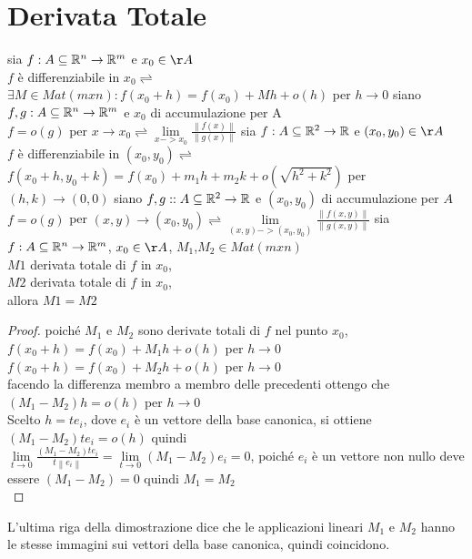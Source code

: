 \section{Derivata Totale}
sia $f:A\subseteq \mathbb{R}^n\rightarrow \mathbb{R}^m$ e $x_0\in\AA$ \\
$f$ è differenziabile in $x_0\rightleftharpoons$ $\exists M\in Mat(mxn) : f(x_0+h) = f(x_0)+Mh+o(h)$ per $h\rightarrow 0$ 
siano $f,g : A\subseteq \mathbb{R}^n\rightarrow \mathbb{R}^m$ e $x_0$ di accumulazione per A \\
$f=o(g)$ per $x\rightarrow x_0 \rightleftharpoons \lim\limits_{x->x_0}\frac{\left\| f(x)\right\| }{\left\| g(x)\right\| }$
sia $f:A\subseteq \mathbb{R}^2\rightarrow \mathbb{R}$ e $(x_0,y_0)\in\AA$ \\
$f$ è differenziabile in $(x_0,y_0)\rightleftharpoons$ $f(x_0+h,y_0+k) = f(x_0)+m_1h+m_2k+o(\sqrt{h^2+k^2})$ per $(h,k)\rightarrow (0,0)$
siano $f,g : :A\subseteq \mathbb{R}^2\rightarrow \mathbb{R}$ e $(x_0,y_0)$ di accumulazione per $A$ \\
$f=o(g)$ per $(x,y)\rightarrow (x_0,y_0) \rightleftharpoons \lim\limits_{(x,y)->(x_0,y_0)}\frac{\left\| f(x,y)\right\| }{\left\| g(x,y)\right\| }$
sia $f:A\subseteq \mathbb{R}^n\rightarrow \mathbb{R}^m$, $x_0\in\AA$, $M_1$,$M_2\in Mat(mxn)$\\
$M1$ derivata totale di $f$ in $x_0$,\\
$M2$ derivata totale di $f$ in $x_0$,\\
allora $M1=M2$\\
\begin{proof}
	poiché $M_1$ e $M_2$ sono derivate totali di $f$ nel punto $x_0$,\\
	$f(x_0+h) = f(x_0)+M_1h+o(h)$ per $h\rightarrow 0$\\
	$f(x_0+h) = f(x_0)+M_2h+o(h)$ per $h\rightarrow 0$\\
	facendo la differenza membro a membro delle precedenti ottengo che $(M_1-M_2)h=o(h)$ per $h\rightarrow 0$\\
	Scelto $h=te_i$, dove $e_i$ è un vettore della base canonica, si ottiene $(M_1-M_2)te_i=o(h)$ quindi\\
	$\lim\limits_{t\rightarrow 0}\frac{(M_1-M_2)te_i}{t\left\| e_i\right\| } = \lim\limits_{t\rightarrow 0}(M_1-M_2)e_i = 0$, poiché $e_i$ è un vettore non nullo deve essere $(M_1-M_2)=0$ quindi $M_1 = M_2$\\
\end{proof}
\observation
L'ultima riga della dimostrazione dice che le applicazioni lineari $M_1$ e $M_2$ hanno le stesse immagini sui vettori della base canonica, quindi coincidono.

